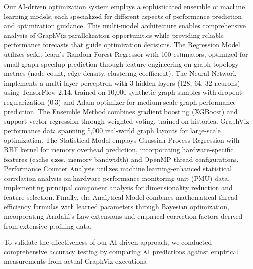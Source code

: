 Our AI-driven optimization system employs a sophisticated ensemble of machine learning models, each specialized for different aspects of performance prediction and optimization guidance. This multi-model architecture enables comprehensive analysis of GraphViz parallelization opportunities while providing reliable performance forecasts that guide optimization decisions. The Regression Model utilizes scikit-learn's Random Forest Regressor with 100 estimators, optimized for small graph speedup prediction through feature engineering on graph topology metrics (node count, edge density, clustering coefficient). The Neural Network implements a multi-layer perceptron with 3 hidden layers (128, 64, 32 neurons) using TensorFlow 2.14, trained on 10,000 synthetic graph samples with dropout regularization (0.3) and Adam optimizer for medium-scale graph performance prediction. The Ensemble Method combines gradient boosting (XGBoost) and support vector regression through weighted voting, trained on historical GraphViz performance data spanning 5,000 real-world graph layouts for large-scale optimization. The Statistical Model employs Gaussian Process Regression with RBF kernel for memory overhead prediction, incorporating hardware-specific features (cache sizes, memory bandwidth) and OpenMP thread configurations. Performance Counter Analysis utilizes machine learning-enhanced statistical correlation analysis on hardware performance monitoring unit (PMU) data, implementing principal component analysis for dimensionality reduction and feature selection. Finally, the Analytical Model combines mathematical thread efficiency formulas with learned parameters through Bayesian optimization, incorporating Amdahl's Law extensions and empirical correction factors derived from extensive profiling data.

To validate the effectiveness of our AI-driven approach, we conducted comprehensive accuracy testing by comparing AI predictions against empirical measurements from actual GraphViz executions. %



